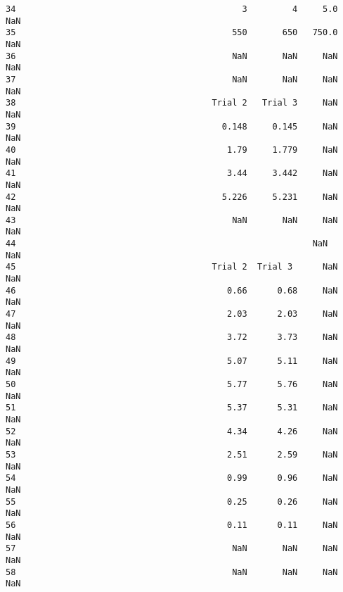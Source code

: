 \documentclass[11pt]{article}
\begin{document}
\begin{tcolorbox}[breakable, size=fbox, boxrule=.5pt, pad at break*=1mm, opacityfill=0]
\begin{Verbatim}[commandchars=\\\{\}]
34                                             3         4     5.0     NaN
35                                           550       650   750.0     NaN
36                                           NaN       NaN     NaN     NaN
37                                           NaN       NaN     NaN     NaN
38                                       Trial 2   Trial 3     NaN     NaN
39                                         0.148     0.145     NaN     NaN
40                                          1.79     1.779     NaN     NaN
41                                          3.44     3.442     NaN     NaN
42                                         5.226     5.231     NaN     NaN
43                                           NaN       NaN     NaN     NaN
44                                             ﻿         ﻿     NaN     NaN
45                                       Trial 2  Trial 3      NaN     NaN
46                                          0.66      0.68     NaN     NaN
47                                          2.03      2.03     NaN     NaN
48                                          3.72      3.73     NaN     NaN
49                                          5.07      5.11     NaN     NaN
50                                          5.77      5.76     NaN     NaN
51                                          5.37      5.31     NaN     NaN
52                                          4.34      4.26     NaN     NaN
53                                          2.51      2.59     NaN     NaN
54                                          0.99      0.96     NaN     NaN
55                                          0.25      0.26     NaN     NaN
56                                          0.11      0.11     NaN     NaN
57                                           NaN       NaN     NaN     NaN
58                                           NaN       NaN     NaN     NaN
\end{Verbatim}
\end{tcolorbox}
        
\end{document}
